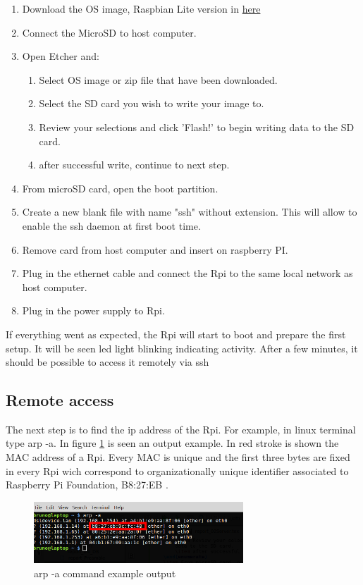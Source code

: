 \begin{enumerate}
	\item Download the OS image, Raspbian Lite version in \href{https://www.raspberrypi.org/downloads/raspbian/}{here}
	\item Connect the MicroSD to host computer.
	\item Open Etcher and:
	\begin{enumerate}
		\item Select OS image or zip file that have been downloaded.
		\item Select the SD card you wish to write your image to.
		\item Review your selections and click 'Flash!' to begin writing data to the SD card.
		\item after successful write, continue to next step.
	\end{enumerate}
	\item From microSD card, open the boot partition.
	\item Create a new blank file with name "ssh" without extension. This will allow to enable the ssh daemon at first boot time.
	\item Remove card from host computer and insert on raspberry PI.
	\item Plug in the ethernet cable and connect the \gls{Rpi} to the same  local network as host computer.
	\item Plug in the power supply to \gls{Rpi}.
\end{enumerate}

If everything went as expected, the \gls{Rpi} will start to boot and prepare the first setup. It will be seen led light blinking indicating activity. After a few minutes, it should be possible to access it remotely via ssh

\subsection{Remote access}
The next step is to find the ip address of the \gls{Rpi}. For example, in linux terminal type \colorbox{gray!10}{arp -a}. In figure \ref{arp_example} is seen an output example. In red stroke is shown the \gls{MAC} address of a \gls{Rpi}. Every \gls{MAC} is unique and the first three bytes are fixed in every \gls{Rpi} wich correspond to organizationally unique identifier \cite{mac_wiki} associated to Raspberry Pi Foundation, B8:27:EB \cite{wireshark_mac}.

\begin{figure}[hb]
	\centering
	\includegraphics[width=0.7\textwidth]{figures/arp_example}
	\caption{arp -a command example output}
	\label{arp_example}
\end{figure}




